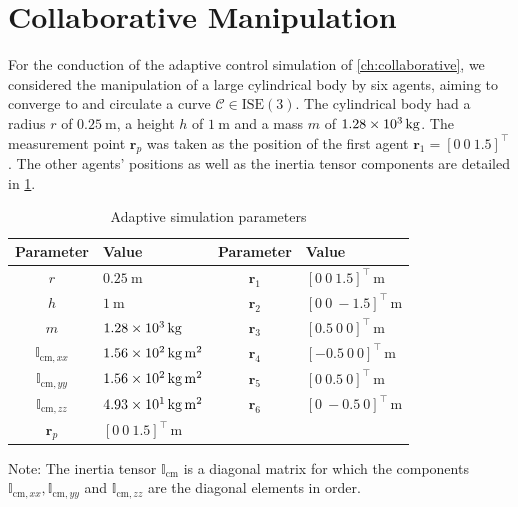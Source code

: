 \section{Collaborative Manipulation}
For the conduction of the adaptive control simulation of \cref{ch:collaborative}, we considered the manipulation of a large cylindrical body by six agents, aiming to converge to and circulate a curve $\mathcal{C}\in\text{ISE}(3)$. The cylindrical body had a radius $r$ of $\qty{0.25}{\meter}$, a height $h$ of $\qty{1}{\meter}$ and a mass $m$ of $\qty{1.28E3}{\kilogram}$. The measurement point $\mathbf{r}_p$ was taken as the position of the first agent $\mathbf{r}_1=[0\ 0\ 1.5]^\top$. The other agents' positions as well as the inertia tensor components are detailed in \cref{tb:parameters}.
\begin{table}[htb]
    \centering
    \begin{threeparttable}
    \caption{Adaptive simulation parameters}\label{tb:parameters}
    \begin{tabular}{clcl}
    Parameter & Value & Parameter & Value\\\hline
    $r$ & $\qty{0.25}{\meter}$ & $\mathbf{r}_{1}$ & $[0\ 0\ 1.5]^\top\,\unit{\meter}$\\
    $h$ & $\qty{1}{\meter}$ & $\mathbf{r}_{2}$ & $[0\ 0\ -1.5]^\top\,\unit{\meter}$\\
    $m$ & $\qty{1.28E3}{\kilogram}$ & 
    $\mathbf{r}_{3}$ & $[0.5\ 0\ 0]^\top\,\unit{\meter}$\\
    $\mathbb{I}_{\text{cm}, xx}$ & $\qty{1.56E2}{\kilogram\meter\squared}$ & 
    $\mathbf{r}_{4}$ & $[-0.5\ 0\ 0]^\top\,\unit{\meter}$\\  
    $\mathbb{I}_{\text{cm}, yy}$ & $\qty{1.56E2}{\kilogram\meter\squared}$ &
    $\mathbf{r}_{5}$ & $[0\ 0.5\ 0]^\top\,\unit{\meter}$\\
    $\mathbb{I}_{\text{cm}, zz}$ & $\qty{4.93E1}{\kilogram\meter\squared}$  & 
    $\mathbf{r}_{6}$ & $[0\ -0.5 \ 0]^\top\,\unit{\meter}$\\
    $\mathbf{r}_{p}$ & $[0\ 0\ 1.5]^\top\,\unit{\meter}$ \\\hline
    \end{tabular}
    \begin{tablenotes}
        \footnotesize
        \item Note: The inertia tensor $\mathbb{I}_\text{cm}$ is a diagonal matrix for which the components $\mathbb{I}_{\text{cm}, xx}, \mathbb{I}_{\text{cm}, yy}$ and $\mathbb{I}_{\text{cm}, zz}$ are the diagonal elements in order.
    \end{tablenotes}
    \end{threeparttable}
\end{table}


